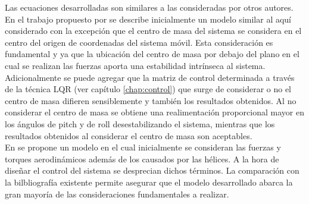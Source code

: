 \documentclass[main]{subfiles}
\begin{document}
Las ecuaciones desarrolladas son similares a las consideradas por otros autores. En el trabajo propuesto por \cite{bib:quadrotor-bible} se describe inicialmente un modelo similar al aqu\'i considerado con la excepci\'on que el centro de masa del sistema se considera en el centro del origen de coordenadas del sistema m\'ovil. Esta consideraci\'on es fundamental y ya que la ubicaci\'on del centro de masa por debajo del plano en el cual se realizan las fuerzas aporta una estabilidad intr\'inseca al sistema. Adicionalmente se puede agregar que la matriz de control determinada a trav\'es de la t\'ecnica LQR (ver cap\'itulo \ref{chap:control}) que surge de considerar o no el centro de masa difieren sensiblemente y tambi\'en los resultados obtenidos. Al no considerar el centro de masa se obtiene una realimentaci\'on proporcional mayor en los \'angulos de pitch y de roll desestabilizando el sistema, mientras que los resultados obtenidos al considerar el centro de masa son aceptables.\\

En \cite{bib:curso_quad} se propone un modelo en el cual inicialmente se consideran las fuerzas y torques aerodin\'amicos adem\'as de los causados por las h\'elices. A la hora de diseñar el control del sistema se desprecian dichos t\'erminos. La comparaci\'on con la bilbliograf\'ia existente permite asegurar que el modelo desarrollado abarca la gran mayor\'ia de las consideraciones fundamentales a realizar.  
\end{document}
